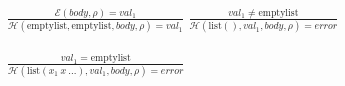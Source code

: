 \documentclass{article}
\begin{document}
\begin{itemize}
    \\
    \hspace*{10mm}
        $\frac
        {\mathcal{E}(body,\rho)=val_1}
        {\mathcal{H}(\text{emptylist},\text{emptylist},body,\rho)=val_1}$
    \hspace*{10mm}
        $\frac
        {   val_1\neq\text{emptylist}}
        {\mathcal{H}(\text{list}(),val_1,body,\rho)=error}$\\
    \\
    \hspace*{10mm}
        $\frac
        {   val_1=\text{emptylist}}
        {\mathcal{H}(\text{list}(x_1\ x\ ...),val_1,body,\rho)=error}$\\
    \\
    
        
\end{itemize}
\end{document}
